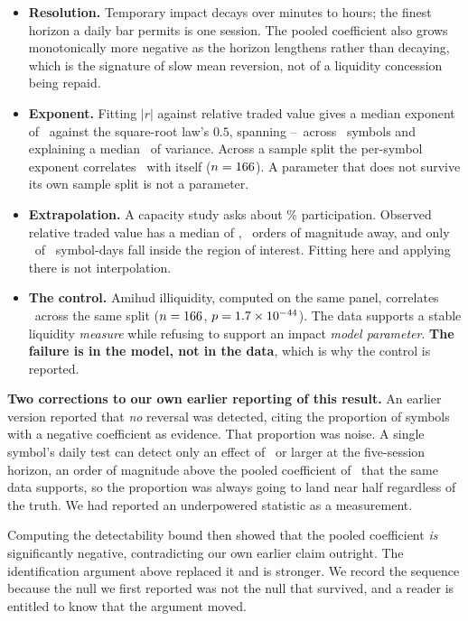 \documentclass[11pt,a4paper]{article}
\begin{document}
\begin{itemize}
\item \textbf{Resolution.} Temporary impact decays over minutes to hours; the finest horizon a daily
bar permits is one session. The pooled coefficient also grows monotonically more negative as the
horizon lengthens rather than decaying, which is the signature of slow mean reversion, not of a
liquidity concession being repaid.
\item \textbf{Exponent.} Fitting $|r|$ against relative traded value gives a median exponent of
\fsDeltaMedian\ against the square-root law's $0.5$, spanning \fsDeltaPTen--\fsDeltaPNinety\ across
\fsDeltaN\ symbols and explaining a median \fsFitRsquared\ of variance. Across a sample split the
per-symbol exponent correlates \fsDeltaSpearman\ with itself ($n = 166$). A parameter
that does not survive its own sample split is not a parameter.
\item \textbf{Extrapolation.} A capacity study asks about \fsTargetParticipation\% participation.
Observed relative traded value has a median of \fsObservedMedianRelValue, \fsOrdersOfMagnitude\
orders of magnitude away, and only \fsSymbolDaysBelowTarget\ of \fsIdentSymbolDays\ symbol-days fall
inside the region of interest. Fitting here and applying there is not interpolation.
\item \textbf{The control.} Amihud illiquidity, computed on the same panel, correlates
\fsAmihudSpearman\ across the same split ($n = 166$, $p = 1.7\times10^{-44}$). The data
supports a stable liquidity \emph{measure} while refusing to support an impact \emph{model
parameter}. \textbf{The failure is in the model, not in the data}, which is why the control is
reported.
\end{itemize}

\begin{selfreport}
\textbf{Two corrections to our own earlier reporting of this result.} An earlier version reported
that \emph{no} reversal was detected, citing the proportion of symbols with a negative coefficient
as evidence. That proportion was noise. A single symbol's daily test can detect only an effect of
\fsMdeSymbolFive\ or larger at the five-session horizon, an order of magnitude above the pooled
coefficient of \fsPooledBetaFive\ that the same data supports, so the proportion was always going to
land near half regardless of the truth. We had reported an underpowered statistic as a measurement.

Computing the detectability bound then showed that the pooled coefficient \emph{is} significantly
negative, contradicting our own earlier claim outright. The identification argument above replaced
it and is stronger. We record the sequence because the null we first reported was not the null that
survived, and a reader is entitled to know that the argument moved.
\end{selfreport}
\end{document}
